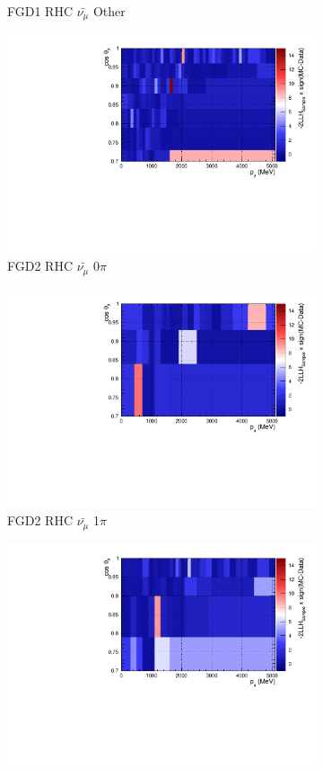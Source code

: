 \begin{figure}[!htbp]
\begin{subfigure}{.32\textwidth}
  \caption{FGD1 RHC $\bar{\nu_{\mu}}$ Other}
  \label{fig:llhcont_FGD1_anti-numuCC_other}
\end{subfigure}
\centering
\begin{subfigure}{.32\textwidth}
  \centering
  \includegraphics[width=0.85\linewidth]{figs/llhcont_Poly574_FGD2_anti-numuCC_0pi.pdf}
  \caption{FGD2 RHC $\bar{\nu_{\mu}}$ 0$\pi$}
  \label{fig:llhcont_FGD2_anti-numuCC_0pi}
\end{subfigure}
\begin{subfigure}{.32\textwidth}
  \centering
  \includegraphics[width=0.85\linewidth]{figs/llhcont_Poly574_FGD2_anti-numuCC_1pi.pdf}
  \caption{FGD2 RHC $\bar{\nu_{\mu}}$ 1$\pi$}
  \label{fig:llhcont_FGD2_anti-numuCC_1pi}
\end{subfigure}
\begin{subfigure}{.32\textwidth}
  \centering
  \includegraphics[width=0.85\linewidth]{figs/llhcont_Poly574_FGD2_anti-numuCC_other.pdf}

\end{subfigure}
\end{figure}
